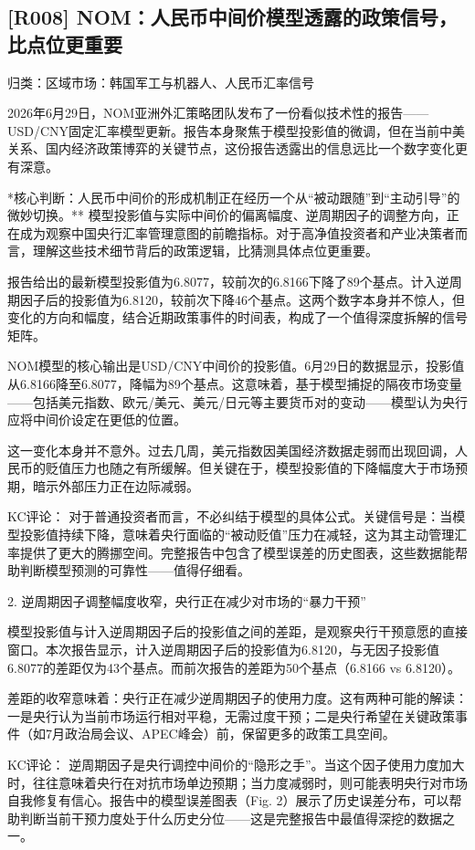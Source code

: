 \documentclass[11pt]{ctexart}
\begin{document}
\subsection{[R008] NOM：人民币中间价模型透露的政策信号，比点位更重要}
{\small\color{refgray}归类：区域市场：韩国军工与机器人、人民币汇率信号}

2026年6月29日，NOM亚洲外汇策略团队发布了一份看似技术性的报告——USD/CNY固定汇率模型更新。报告本身聚焦于模型投影值的微调，但在当前中美关系、国内经济政策博弈的关键节点，这份报告透露出的信息远比一个数字变化更有深意。

*核心判断：人民币中间价的形成机制正在经历一个从“被动跟随”到“主动引导”的微妙切换。** 模型投影值与实际中间价的偏离幅度、逆周期因子的调整方向，正在成为观察中国央行汇率管理意图的前瞻指标。对于高净值投资者和产业决策者而言，理解这些技术细节背后的政策逻辑，比猜测具体点位更重要。

报告给出的最新模型投影值为6.8077，较前次的6.8166下降了89个基点。计入逆周期因子后的投影值为6.8120，较前次下降46个基点。这两个数字本身并不惊人，但变化的方向和幅度，结合近期政策事件的时间表，构成了一个值得深度拆解的信号矩阵。

NOM模型的核心输出是USD/CNY中间价的投影值。6月29日的数据显示，投影值从6.8166降至6.8077，降幅为89个基点。这意味着，基于模型捕捉的隔夜市场变量——包括美元指数、欧元/美元、美元/日元等主要货币对的变动——模型认为央行应将中间价设定在更低的位置。

这一变化本身并不意外。过去几周，美元指数因美国经济数据走弱而出现回调，人民币的贬值压力也随之有所缓解。但关键在于，模型投影值的下降幅度大于市场预期，暗示外部压力正在边际减弱。

KC评论： 对于普通投资者而言，不必纠结于模型的具体公式。关键信号是：当模型投影值持续下降，意味着央行面临的“被动贬值”压力在减轻，这为其主动管理汇率提供了更大的腾挪空间。完整报告中包含了模型误差的历史图表，这些数据能帮助判断模型预测的可靠性——值得仔细看。

2. 逆周期因子调整幅度收窄，央行正在减少对市场的“暴力干预”

模型投影值与计入逆周期因子后的投影值之间的差距，是观察央行干预意愿的直接窗口。本次报告显示，计入逆周期因子后的投影值为6.8120，与无因子投影值6.8077的差距仅为43个基点。而前次报告的差距为50个基点（6.8166 vs 6.8120）。

差距的收窄意味着：央行正在减少逆周期因子的使用力度。这有两种可能的解读：一是央行认为当前市场运行相对平稳，无需过度干预；二是央行希望在关键政策事件（如7月政治局会议、APEC峰会）前，保留更多的政策工具空间。

KC评论： 逆周期因子是央行调控中间价的“隐形之手”。当这个因子使用力度加大时，往往意味着央行在对抗市场单边预期；当力度减弱时，则可能表明央行对市场自我修复有信心。报告中的模型误差图表（Fig. 2）展示了历史误差分布，可以帮助判断当前干预力度处于什么历史分位——这是完整报告中最值得深挖的数据之一。
\end{document}
